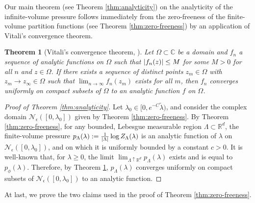 \documentclass[11pt]{article}
\newcommand{\R}{\mathbb R}
\newcommand{\C}{\mathbb C}
\newcommand{\lsconst}{C}
\numberwithin{equation}{section}
\theoremstyle{plain}
\newtheorem{theorem}{Theorem}[section]
\theoremstyle{definition}
\theoremstyle{remark}
\begin{document}
Our main theorem (see Theorem \ref{thm:analyticity}) on the analyticity of the infinite-volume pressure follows immediately from the zero-freeness of the finite-volume partition functions (see Theorem \ref{thm:zero-freeness}) by an application of Vitali's convergence theorem.

\begin{theorem}[Vitali's convergence theorem, {\cite[Theorem 20]{michelen2023analyticity}}]
\label{thm:Vitali}
Let $\Omega\subset\C$ be a domain and $f_{n}$ a sequence of analytic functions on $\Omega$ such that $\abs{f_{n}(z)}\le M$ for some $M>0$ for all $n$ and $z\in\Omega$.
If there exists a sequence of distinct points $z_{m}\in\Omega$ with $z_{m}\rightarrow z_{\infty}\in\Omega$ such that $\lim_{n\rightarrow\infty}f_{n}(z_{m})$ exists for all $m$, then $f_{n}$ converges uniformly on compact subsets of $\Omega$ to an analytic function $f$ on $\Omega$.
\end{theorem}

\begin{proof}[Proof of Theorem \ref{thm:analyticity}]
Let $\lambda_{0}\in[0,e^{-\lsconst}\tilde{\lambda})$, and consider the complex domain $\mathcal{N}_{\epsilon}([0,\lambda_{0}])$ given by Theorem \ref{thm:zero-freeness}.
By Theorem \ref{thm:zero-freeness}, for any bounded, Lebesgue measurable region $\Lambda\subset\R^{d}$, the finite-volume pressure $p_{\Lambda}(\lambda):=\frac{1}{\abs{\Lambda}}\log Z_{\Lambda}(\lambda)$ is an analytic function of $\lambda$ on $\mathcal{N}_{\epsilon}([0,\lambda_{0}])$, and on which it is uniformly bounded by a constant $c>0$.
It is well-known that, for $\lambda\ge 0$, the limit $\lim_{\Lambda\uparrow\R^{d}}p_{\Lambda}(\lambda)$ exists and is equal to $p_{\phi}(\lambda)$.
Therefore, by Theorem \ref{thm:Vitali}, $p_{\Lambda}(\lambda)$ converges uniformly on compact subsets of $\mathcal{N}_{\epsilon}([0,\lambda_{0}])$ to an analytic function.
\end{proof}

At last, we prove the two claims used in the proof of Theorem \ref{thm:zero-freeness}.
\end{document}
